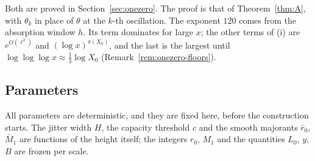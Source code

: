 Both are proved in Section~\ref{sec:onezero}. The proof is that of Theorem~\ref{thm:A}, with $\theta_k$ in place of $\theta$ at the
$k$-th oscillation. The exponent $120$ comes from the absorption window $h$. Its term dominates for large $x$; the other terms of (i) are
$e^{O(\ell^2)}$ and $(\log x)^{\pi(X_0)}$, and the last is the largest until $\log\log\log x\approx\frac13\log X_0$
(Remark~\ref{rem:onezero-floors}).

\subsection{Parameters}\label{sec:params}
All parameters are deterministic, and they are fixed here, before the construction starts. The jitter width $H$, the capacity
threshold $c$ and the smooth majorants $\bar r_0$, $\bar M_1$ are functions of the height itself; the integers $r_0$, $M_1$ and the
quantities $L_0$, $y$, $B$ are frozen per scale.
